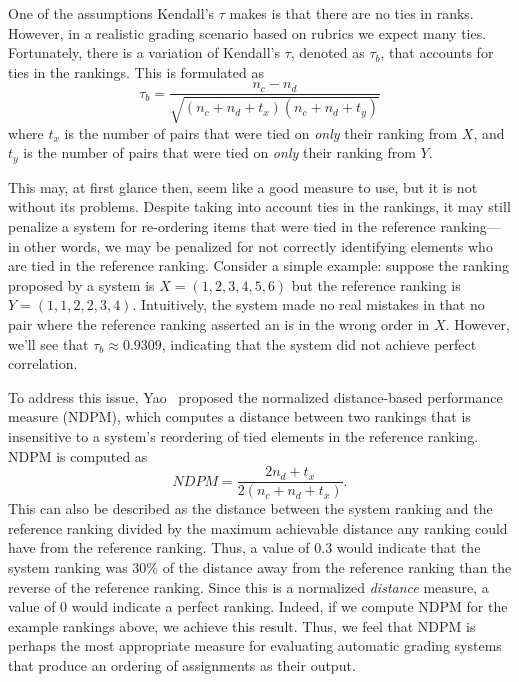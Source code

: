 One of the assumptions Kendall's $\tau$ makes is that there are no ties in
ranks. However, in a realistic grading scenario based on rubrics we expect
many ties. Fortunately, there is a variation of Kendall's $\tau$, denoted
as $\tau_b$, that accounts for ties in the rankings. This is formulated as
\[
    \tau_b = \frac{n_c - n_d}{\sqrt{(n_c + n_d + t_x)(n_c + n_d + t_y)}}
\]
where $t_x$ is the number of pairs that were tied on \emph{only} their
ranking from $X$, and $t_y$ is the number of pairs that were tied on
\emph{only} their ranking from $Y$.

This may, at first glance then, seem like a good measure to use, but it is
not without its problems. Despite taking into account ties in the rankings,
it may still penalize a system for re-ordering items that were tied in the
reference ranking---in other words, we may be penalized for not correctly
identifying elements who are tied in the reference ranking. Consider a
simple example: suppose the ranking proposed by a system is $X =
(1,2,3,4,5,6)$ but the reference ranking is $Y = (1,1,2,2,3,4)$.
Intuitively, the system made no real mistakes in that no pair where the
reference ranking asserted an is in the wrong order in $X$. However, we'll
see that $\tau_b \approx 0.9309$, indicating that the system did not achieve
perfect correlation.

To address this issue, Yao~\cite{Yao:1995:JASIS} proposed the normalized
distance-based performance measure (NDPM), which computes a distance
between two rankings that is insensitive to a system's reordering of tied
elements in the reference ranking. NDPM is computed as
\[
    NDPM = \frac{2n_d + t_x}{2(n_c + n_d + t_x)}.
\]
This can also be described as the distance between the system ranking and
the reference ranking divided by the maximum achievable distance any
ranking could have from the reference ranking. Thus, a value of $0.3$ would
indicate that the system ranking was 30\% of the distance away from the
reference ranking than the reverse of the reference ranking.  Since this is
a normalized \emph{distance} measure, a value of $0$ would indicate a
perfect ranking. Indeed, if we compute NDPM for the example rankings above,
we achieve this result. Thus, we feel that NDPM is perhaps the most
appropriate measure for evaluating automatic grading systems that produce
an ordering of assignments as their output.


